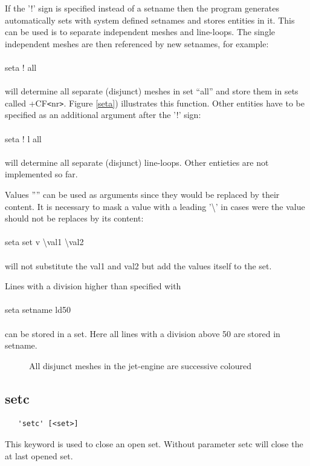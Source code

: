 \documentclass{article}
\begin{document}
If the '!' sign is specified instead of a setname then the program generates automatically sets with system defined setnames and stores entities in it. This can be used is to separate independent meshes and line-loops. The single independent meshes are then referenced by new setnames, for example:\\\\seta ! all\\\\will determine all separate (disjunct) meshes in set ``all'' and store them in sets called +CF\verb_<_nr\verb_>_. Figure \ref{seta}) illustrates this function. Other entities have to be specified as an additional argument after the '!' sign:\\\\seta ! l all\\\\will determine all separate (disjunct) line-loops. Other entieties are not implemented so far. 

Values '''' can be used as arguments since they would be replaced by their content. It is necessary to mask a value with a leading '\textbackslash{}' in cases were the value should not be replaces by its content:\\\\seta set v \textbackslash{}val1 \textbackslash{}val2\\\\will not substitute the val1 and val2 but add the values itself to the set.

Lines with a division higher than specified with\\\\
seta setname ld50\\\\
can be stored in a set. Here all lines with a division above 50 are stored in setname. 

  
\begin{figure}[h]
\caption{\label{engine}All disjunct meshes in the jet-engine are successive coloured}
\end{figure}

\subsection{\label{setc}setc}
\begin{verbatim}
   'setc' [<set>] 
\end{verbatim}
This keyword is used to close an open set. Without parameter setc will close the at last opened set.
\end{document}
